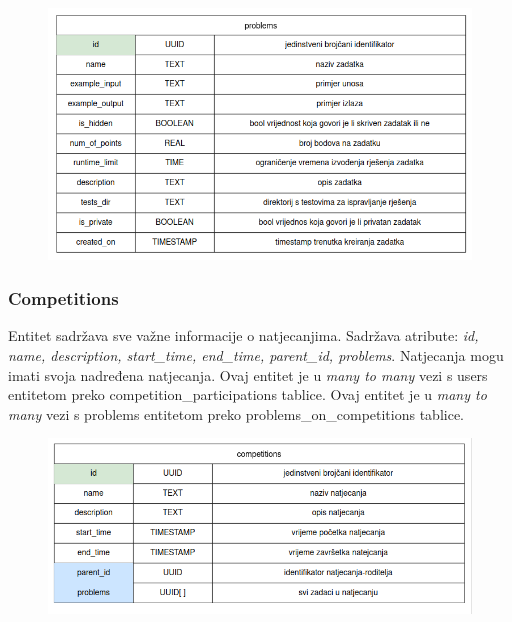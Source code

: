 				\vspace{20mm}

				\begin{figure}[htbp]
					\centering
					\includegraphics[width=\linewidth]{slike/problems_tablica.png}
				\end{figure}

				\vspace{30mm}

				\subsubsection*{Competitions}

				Entitet  sadržava sve važne informacije o natjecanjima. Sadržava atribute: \textit{id, name, description, start\_time, end\_time, parent\_id, problems}. Natjecanja mogu imati svoja nadređena natjecanja. Ovaj entitet je u \textit{many to many} vezi s users entitetom preko competition\_participations tablice. Ovaj entitet je u \textit{many to many} vezi s problems entitetom preko problems\_on\_competitions tablice.                          
			
				\vspace{20mm}

				\begin{figure}[htbp]
					\centering
					\includegraphics[width=\linewidth]{slike/competitions_tablica.png}
				\end{figure}

